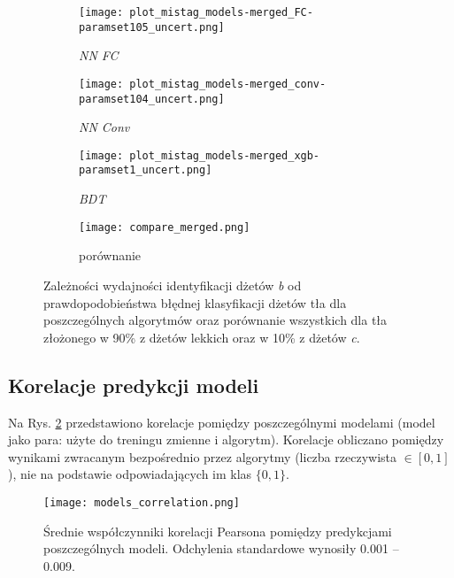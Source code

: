 \begin{figure}[h]
	\centering
	
    \begin{subfigure}[b]{0.49\textwidth}
	\texttt{[image: plot\_mistag\_models-merged\_FC-paramset105\_uncert.png]}
	\caption{\textit{NN FC}}
	\end{subfigure}
    \begin{subfigure}[b]{0.49\textwidth}
	\texttt{[image: plot\_mistag\_models-merged\_conv-paramset104\_uncert.png]}	
	\caption{\textit{NN Conv}}
	\end{subfigure}
    \begin{subfigure}[b]{0.49\textwidth}
	\texttt{[image: plot\_mistag\_models-merged\_xgb-paramset1\_uncert.png]}
	\caption{\textit{BDT}}
	\end{subfigure}
	\begin{subfigure}[b]{0.49\textwidth}
	\texttt{[image: compare\_merged.png]}
	\caption{porównanie}
	\end{subfigure}
	
	\caption{Zależności wydajności identyfikacji dżetów \textit{b} od prawdopodobieństwa błędnej klasyfikacji dżetów tła dla poszczególnych algorytmów oraz porównanie wszystkich dla tła złożonego w 90\% z dżetów lekkich oraz w 10\% z dżetów \textit{c}.}
	\label{fig:ROC_merged}
\end{figure}

\FloatBarrier
\subsection{Korelacje predykcji modeli}

Na Rys. \ref{fig:models_corr} przedstawiono korelacje pomiędzy poszczególnymi modelami (model jako para: użyte do treningu zmienne i algorytm). Korelacje obliczano pomiędzy wynikami zwracanym bezpośrednio przez algorytmy (liczba rzeczywista $\in [0,1]$), nie na podstawie odpowiadających im klas $\{0,1\}$.

\begin{figure}[h]
	\centering
	\texttt{[image: models\_correlation.png]}
	\caption{Średnie współczynniki korelacji Pearsona pomiędzy predykcjami poszczególnych modeli. Odchylenia standardowe wynosiły 0.001 -- 0.009.}
	\label{fig:models_corr}
\end{figure}


